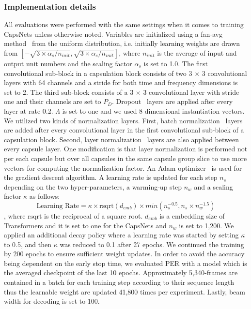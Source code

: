 \documentclass[review]{elsarticle}
\begin{document}
\subsubsection{Implementation details}
All evaluations were performed with the same settings when it comes to training CapsNets unless otherwise noted.
Variables are initialized using a fan-avg method~\citep{DBLP:journals/jmlr/GlorotB10} from the uniform distribution, i.e. initially learning weights are drawn from \([-\sqrt{3 \times \alpha_s / n_{init}}, \sqrt{3 \times \alpha_s / n_{init}}]\), where \(n_{init}\) is the average of input and output unit numbers and the scaling factor $\alpha_s$ is set to 1.0.
The first convolutional sub-block in a capsulation block consists of two 3 \(\times\) 3 convolutional layers with 64 channels and a stride for both time and frequency dimensions is set to 2.
The third sub-block consists of a 3 \(\times\) 3 convolutional layer with stride one and their channels are set to \(P_D\).
Dropout~\citep{DBLP:journals/jmlr/SrivastavaHKSS14} layers are applied after every layer at rate 0.2.
$\Lambda$ is set to one and we used 8 dimensional instantiation vectors.
We utilized two kinds of normalization layers.
First, batch normalization~\citep{DBLP:conf/icml/IoffeS15} layers are added after every convolutional layer in the first convolutional sub-block of a capsulation block.
Second, layer normalization~\citep{DBLP:journals/corr/BaKH16} layers are also applied between every capsule layer.
One modification is that layer normalization is performed not per each capsule but over all capsules in the same capsule group slice to use more vectors for computing the normalization factor.
An Adam optimizer~\citep{DBLP:journals/corr/KingmaB14} is used for the gradient descent algorithm.
A learning rate is updated for each step $n_{s}$ depending on the two hyper-parameters, a warming-up step $n_{w}$ and a scaling factor $\kappa$ as follows:
\begin{equation}
\text{Learning Rate} = \kappa \times \text{rsqrt}(d_{emb}) \times min(n_{s}^{-0.5}, n_{s} \times n_{w}^{-1.5})
\label{eq:lr}
\end{equation}
, where \(\text{rsqrt}\) is the reciprocal of a square root.
\(d_{emb}\) is a embedding size of Transformers and it is set to one for the CapsNets and $n_{w}$ is set to 1,200.
We applied an additional decay policy where a learning rate was started by setting $\kappa$ to 0.5, and then $\kappa$ was reduced to 0.1 after 27 epochs.
We continued the training by 200 epochs to ensure sufficient weight updates.
In order to avoid the accuracy being dependent on the early stop time, we evaluated PER with a model which is the averaged checkpoint of the last 10 epochs.
Approximately 5,340-frames are contained in a batch for each training step according to their sequence length thus the learnable weight are updated 41,800 times per experiment.
Lastly, beam width for decoding is set to 100.
\end{document}
